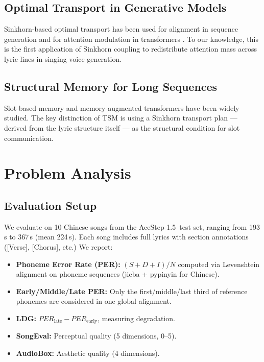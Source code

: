 \documentclass[11pt,a4paper]{article}
\newcommand{\dit}{AceStep 1.5}
\newcommand{\per}{PER}
\begin{document}
\subsection{Optimal Transport in Generative Models}

Sinkhorn-based optimal transport has been used for alignment in sequence generation \cite{ot_sequence, sinkhorn_transformer} and for attention modulation in transformers \cite{ot_attention}. To our knowledge, this is the first application of Sinkhorn coupling to redistribute attention mass across lyric lines in singing voice generation.

\subsection{Structural Memory for Long Sequences}

Slot-based memory \cite{slot_attention} and memory-augmented transformers \cite{mem_transformer} have been widely studied. The key distinction of TSM is using a Sinkhorn transport plan --- derived from the lyric structure itself --- as the structural condition for slot communication.

\section{Problem Analysis}
\label{sec:analysis}

\subsection{Evaluation Setup}

We evaluate on 10 Chinese songs from the \dit~test set, ranging from 193\,s to 367\,s (mean 224\,s). Each song includes full lyrics with section annotations ([Verse], [Chorus], etc.) We report:
\begin{itemize}
    \item \textbf{Phoneme Error Rate (\per):} $(S+D+I)/N$ computed via Levenshtein alignment on phoneme sequences (jieba + pypinyin for Chinese).
    \item \textbf{Early/Middle/Late \per:} Only the first/middle/last third of reference phonemes are considered in one global alignment.
    \item \textbf{LDG:} $\per_{\text{late}} - \per_{\text{early}}$, measuring degradation.
    \item \textbf{SongEval:} Perceptual quality (5 dimensions, 0--5).
    \item \textbf{AudioBox:} Aesthetic quality (4 dimensions).
\end{itemize}
\end{document}

